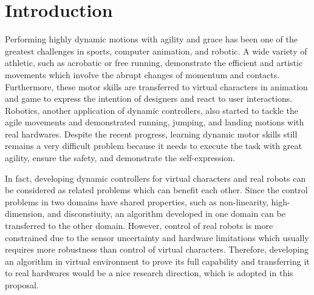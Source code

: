 \chapter{Introduction}


Performing highly dynamic motions with agility and grace has been
one of the greatest challenges in sports, computer animation, and robotic.
A wide variety of athletic, such as acrobatic or free running, demonstrate the
efficient and artistic movements which involve the abrupt changes of momentum
and contacts.
Furthermore, these motor skills are transferred to virtual characters 
in animation and game to express the intention of designers
and react to user interactions.
Robotics, another application of dynamic controllers, also started 
to tackle the agile movements and demonstrated
running, jumping, and landing motions with real hardwares.
Despite the recent progress, 
learning dynamic motor skills still remains a very difficult
problem because it needs to execute the task with great agility, 
ensure the safety, and demonstrate the self-expression.

In fact, developing dynamic controllers for virtual characters and
real robots can be considered as related problems
which can benefit each other.
Since the control problems in two domains have shared properties,
such as non-linearity, high-dimension, and disconstiuity,
an algorithm developed in one domain can be transferred 
to the other domain.
However, control of real robots is more constrained
due to the sensor uncertainty and hardware limitations which 
usually requires more robustness than control of virtual
characters.
Therefore, developing an algorithm in virtual environment to prove its
full capability and transferring it to real hardwares would be
a nice research direction, which is adopted in this proposal.

